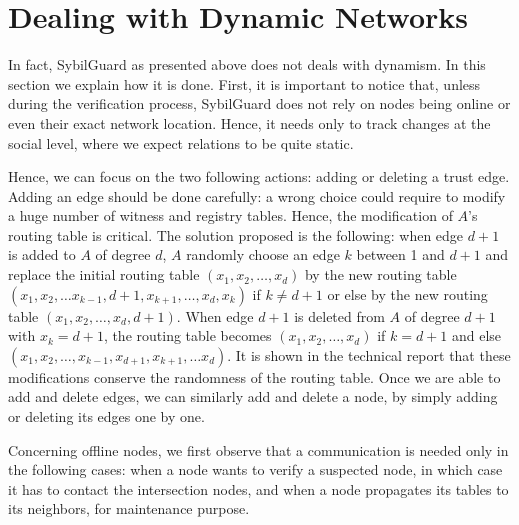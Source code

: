 \documentclass[a4paper,11pt]{article}
\begin{document}
\section{Dealing with Dynamic Networks}

In fact, SybilGuard as presented above does not deals with dynamism.
In this section we explain how it is done. First, it is important to
notice that, unless during the verification process, SybilGuard does not
rely on nodes being online or even their exact network
location. Hence, it needs only to track changes at the social level,
where we expect relations to be quite static.


Hence, we can focus on the two following actions: adding or deleting a
trust edge. Adding an edge should be done carefully: a wrong choice
could require to modify a huge number of witness and registry tables.
Hence, the modification of $A$'s routing table is critical. The
solution proposed is the following: when edge $d+1$ is added to $A$ of
degree $d$, $A$ randomly choose an edge $k$ between 1 and $d+1$ and
replace the initial routing table $(x_1,x_2,\dots, x_d)$ by the new
routing table $(x_1,x_2,\dots x_{k-1},d+1,x_{k+1},\dots, x_d, x_k)$ if
$k\neq d+1$ or else by the new routing table $(x_1,x_2,\dots
,x_d,d+1)$.  When edge $d+1$ is deleted from $A$ of degree $d+1$ with
$x_k=d+1$, the routing table becomes $(x_1,x_2,\dots, x_d)$ if $k=d+1$
and else $(x_1,x_2,\dots, x_{k-1}, x_{d+1}, x_{k+1},\dots x_d)$. It is
shown in the technical report that these modifications conserve the
randomness of the routing table. Once we are able to add and delete
edges, we can similarly add and delete a node, by simply adding or
deleting its edges one by one.


Concerning offline nodes, we first observe that a communication is
needed only in the following cases: when a node wants to verify a
suspected node, in which case it has to contact the intersection
nodes, and when a node propagates its tables to its neighbors, for
maintenance purpose.
\end{document}
